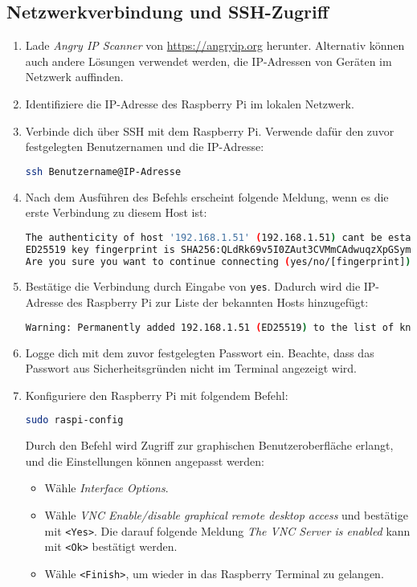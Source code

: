 \documentclass[a4paper,12pt]{article}
\begin{document}
\subsection{Netzwerkverbindung und SSH-Zugriff}
\begin{enumerate}
    \item Lade \textit{Angry IP Scanner} von \url{https://angryip.org} herunter. Alternativ können auch andere Lösungen verwendet werden, die IP-Adressen von Geräten im Netzwerk auffinden.
    \item Identifiziere die IP-Adresse des Raspberry Pi im lokalen Netzwerk.
    \item Verbinde dich über SSH mit dem Raspberry Pi. Verwende dafür den zuvor festgelegten Benutzernamen und die IP-Adresse:
\begin{lstlisting}[language=bash]
ssh Benutzername@IP-Adresse 
\end{lstlisting}
    \item Nach dem Ausführen des Befehls erscheint folgende Meldung, wenn es die erste Verbindung zu diesem Host ist:
\begin{lstlisting}[language=bash]
The authenticity of host '192.168.1.51' (192.168.1.51) cant be established.
ED25519 key fingerprint is SHA256:QLdRk69v5I0ZAut3CVMmCAdwuqzXpGSymdHJB/FWars.
Are you sure you want to continue connecting (yes/no/[fingerprint])?
\end{lstlisting}
    \item Bestätige die Verbindung durch Eingabe von \texttt{yes}. Dadurch wird die IP-Adresse des Raspberry Pi zur Liste der bekannten Hosts hinzugefügt:
\begin{lstlisting}[language=bash]
Warning: Permanently added 192.168.1.51 (ED25519) to the list of known hosts.
\end{lstlisting}
    \item Logge dich mit dem zuvor festgelegten Passwort ein. Beachte, dass das Passwort aus Sicherheitsgründen nicht im Terminal angezeigt wird.
    \item Konfiguriere den Raspberry Pi mit folgendem Befehl:
\begin{lstlisting}[language=bash]
sudo raspi-config
\end{lstlisting}
    Durch den Befehl wird Zugriff zur graphischen Benutzeroberfläche erlangt, und die Einstellungen können angepasst werden:
    \begin{itemize}
        \item Wähle \textit{Interface Options}.
        \item Wähle \textit{VNC Enable/disable graphical remote desktop access} und bestätige mit \texttt{<Yes>}. Die darauf folgende Meldung \textit{The VNC Server is enabled} kann mit \texttt{<Ok>} bestätigt werden.
        \item Wähle \texttt{<Finish>}, um wieder in das Raspberry Terminal zu gelangen.
    \end{itemize}
\end{enumerate}
\end{document}
